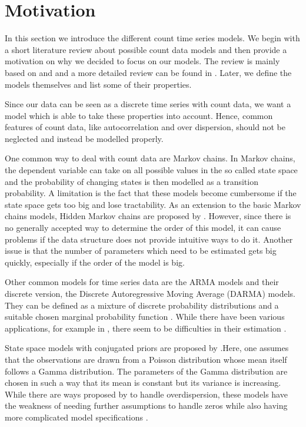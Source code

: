 \section{Motivation}
\label{sec:Ingarch Motivation}

In this section we introduce the different count time series models. We begin with a short literature review about possible count data models and then provide a motivation on why we decided to focus on our models. The review is mainly based on \cite{Liboschik:2016} and \cite{Heinen:2003} and a more detailed review can be found in \cite{Zucchini:1997}. Later, we define the models themselves and list some of their properties. 

Since our data can be seen as a discrete time series with count data, we want a model which is able to take these properties into account. Hence, common features of count data, like autocorrelation and over dispersion, should not be neglected and instead be modelled properly.
 
One common way to deal with count data are Markov chains. In Markov chains, the dependent variable can take on all possible values in the so called state space and the probability of changing states is then modelled as a transition probability. A limitation is the fact that these models become cumbersome if the state space gets too big and lose tractability. As an extension to the basic Markov chains models, Hidden Markov chains are proposed by \cite{Zucchini:1997}. However, since there is no generally accepted way to determine the order of this model, it can cause problems if the data structure does not provide intuitive ways to do it. Another issue is that the number of parameters which need to be estimated gets big quickly, especially if the order of the model is big. 

Other common models for time series data are the ARMA models and their discrete version, the Discrete Autoregressive Moving Average (DARMA) models. They can be defined as a mixture of discrete probability distributions and a suitable chosen marginal probability function \cite{Biswas:2009}. While there have been various applications, for example in \cite{Chang:1987}, there seem to be difficulties in their estimation \cite{Heinen:2003}. 

State space models with conjugated priors are proposed by \cite{Harvey:1989}.Here, one assumes that the observations are drawn from a Poisson distribution whose mean itself follows a Gamma distribution. The parameters of the Gamma distribution are chosen in such a way that its mean is constant but its variance is increasing. While there are ways proposed by \cite{Qaqish:1988} to handle overdispersion, these models have the weakness of needing further assumptions to handle zeros while also having more complicated model specifications \cite{Heinen:2003}.

